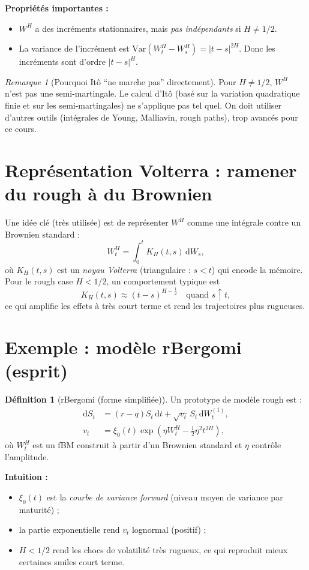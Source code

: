 \documentclass[11pt,a4paper]{report}
\newcommand{\dd}{\mathrm{d}}
\newcommand{\Var}{\mathrm{Var}}
\newcommand{\1}{\mathbbm{1}}
\theoremstyle{definition}
\newtheorem{definition}{Définition}[chapter]
\theoremstyle{plain}
\theoremstyle{remark}
\newtheorem{remark}{Remarque}[chapter]
\begin{document}
\textbf{Propriétés importantes :}
\begin{itemize}
  \item $W^H$ a des incréments stationnaires, mais \emph{pas indépendants} si $H\neq 1/2$.
  \item La variance de l'incrément est $\Var(W_t^H-W_s^H)=|t-s|^{2H}$.
  Donc les incréments sont d'ordre $|t-s|^H$.
\end{itemize}

\begin{remark}[Pourquoi Itô ``ne marche pas'' directement]
Pour $H\neq 1/2$, $W^H$ n'est pas une semi-martingale.
Le calcul d'Itô (basé sur la variation quadratique finie et sur les semi-martingales) ne s'applique pas tel quel.
On doit utiliser d'autres outils (intégrales de Young, Malliavin, rough paths), trop avancés pour ce cours.
\end{remark}

\section{Représentation Volterra : ramener du rough à du Brownien}
Une idée clé (très utilisée) est de représenter $W^H$ comme une intégrale contre un Brownien standard :
\[
W_t^H = \int_0^t K_H(t,s)\,\dd W_s,
\]
où $K_H(t,s)$ est un \emph{noyau Volterra} (triangulaire : $s<t$) qui encode la mémoire.
Pour le rough case $H<1/2$, un comportement typique est
\[
K_H(t,s) \approx (t-s)^{H-\frac12}
\quad \text{quand } s\uparrow t,
\]
ce qui amplifie les effets à très court terme et rend les trajectoires plus rugueuses.

\section{Exemple : modèle rBergomi (esprit)}
\begin{definition}[rBergomi (forme simplifiée)]
Un prototype de modèle rough est :
\begin{align*}
\dd S_t &= (r-q)S_t\,\dd t + \sqrt{v_t}\,S_t\,\dd W_t^{(1)},\\
v_t &= \xi_0(t)\exp\left(\eta W_t^H - \frac12 \eta^2 t^{2H}\right),
\end{align*}
où $W_t^H$ est un fBM construit à partir d'un Brownien standard et $\eta$ contrôle l'amplitude.
\end{definition}

\textbf{Intuition :}
\begin{itemize}
  \item $\xi_0(t)$ est la \emph{courbe de variance forward} (niveau moyen de variance par maturité) ;
  \item la partie exponentielle rend $v_t$ lognormal (positif) ;
  \item $H<1/2$ rend les chocs de volatilité très rugueux, ce qui reproduit mieux certaines smiles court terme.
\end{itemize}
\end{document}
